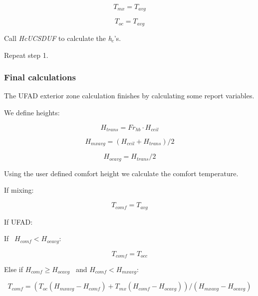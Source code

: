 {\begin{equation}
{T_{mx}} = {T_{avg}}
\end{equation}

\begin{equation}
{T_{oc}} = {T_{avg}}
\end{equation}

Call \emph{HcUCSDUF} to calculate the \emph{h\(_{c}\)}'s.

Repeat step 1.

\subsubsection{Final calculations}\label{final-calculations-2}

The UFAD exterior zone calculation finishes by calculating some report variables.

We define heights:

\begin{equation}
{H_{trans}} = F{r_{hb}} \cdot {H_{ceil}}
\end{equation}

\begin{equation}
{H_{mxavg}} = \left( {{H_{ceil}} + {H_{trans}}} \right)/2
\end{equation}

\begin{equation}
{H_{ocavg}} = {H_{trans}}/2
\end{equation}

Using the user defined comfort height we calculate the comfort temperature.

If mixing:

\begin{equation}
{T_{comf}} = {T_{avg}}
\end{equation}

If UFAD:

If~ \({H_{comf}} < {H_{ocavg}}\):

\begin{equation}
{T_{comf}} = {T_{occ}}
\end{equation}

Else if \({H_{comf}} \ge {H_{ocavg}}\) ~and \({H_{comf}} < {H_{mxavg}}\):

\begin{equation}
{T_{comf}} = \left( {{T_{oc}}\left( {{H_{mxavg}} - {H_{comf}}} \right) + {T_{mx}}\left( {{H_{comf}} - {H_{ocavg}}} \right)} \right)/\left( {{H_{mxavg}} - {H_{ocavg}}} \right)
\end{equation}

}
